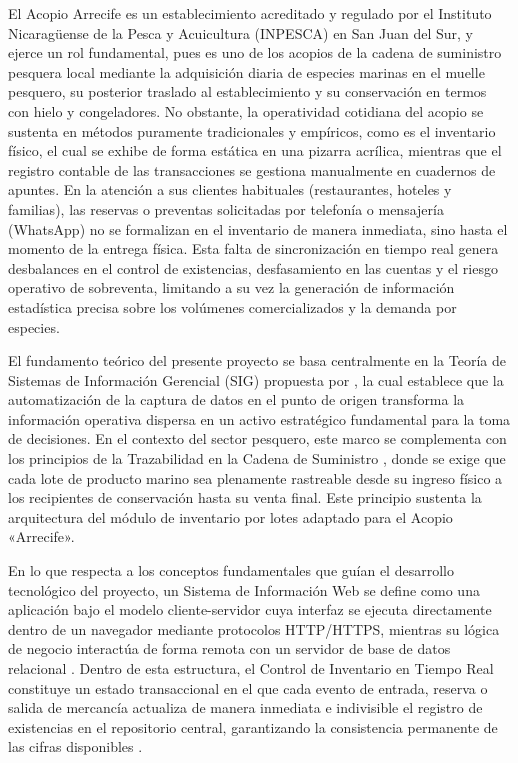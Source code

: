 El Acopio Arrecife es un establecimiento acreditado y regulado por el Instituto Nicaragüense de la Pesca y Acuicultura (INPESCA) en San Juan del Sur, y ejerce un rol fundamental, pues es uno de los acopios de la cadena de suministro pesquera local mediante la adquisición diaria de especies marinas en el muelle pesquero, su posterior traslado al establecimiento y su conservación en termos con hielo y congeladores. No obstante, la operatividad cotidiana del acopio se sustenta en métodos puramente tradicionales y empíricos, como es el inventario físico, el cual se exhibe de forma estática en una pizarra acrílica, mientras que el registro contable de las transacciones se gestiona manualmente en cuadernos de apuntes. En la atención a sus clientes habituales (restaurantes, hoteles y familias), las reservas o preventas solicitadas por telefonía o mensajería (WhatsApp) no se formalizan en el inventario de manera inmediata, sino hasta el momento de la entrega física. Esta falta de sincronización en tiempo real genera desbalances en el control de existencias, desfasamiento en las cuentas y el riesgo operativo de sobreventa, limitando a su vez la generación de información estadística precisa sobre los volúmenes comercializados y la demanda por especies.

El fundamento teórico del presente proyecto se basa centralmente en la Teoría de Sistemas de Información Gerencial (SIG) propuesta por \textcite{laudon2020}, la cual establece que la automatización de la captura de datos en el punto de origen transforma la información operativa dispersa en un activo estratégico fundamental para la toma de decisiones. En el contexto del sector pesquero, este marco se complementa con los principios de la Trazabilidad en la Cadena de Suministro \parencite{gs1mexico2022}, donde se exige que cada lote de producto marino sea plenamente rastreable desde su ingreso físico a los recipientes de conservación hasta su venta final. Este principio sustenta la arquitectura del módulo de inventario por lotes adaptado para el Acopio «Arrecife».

En lo que respecta a los conceptos fundamentales que guían el desarrollo tecnológico del proyecto, un Sistema de Información Web se define como una aplicación bajo el modelo cliente-servidor cuya interfaz se ejecuta directamente dentro de un navegador mediante protocolos HTTP/HTTPS, mientras su lógica de negocio interactúa de forma remota con un servidor de base de datos relacional \parencite{sommerville2019}. Dentro de esta estructura, el Control de Inventario en Tiempo Real constituye un estado transaccional en el que cada evento de entrada, reserva o salida de mercancía actualiza de manera inmediata e indivisible el registro de existencias en el repositorio central, garantizando la consistencia permanente de las cifras disponibles \parencite{pressman2021}.

